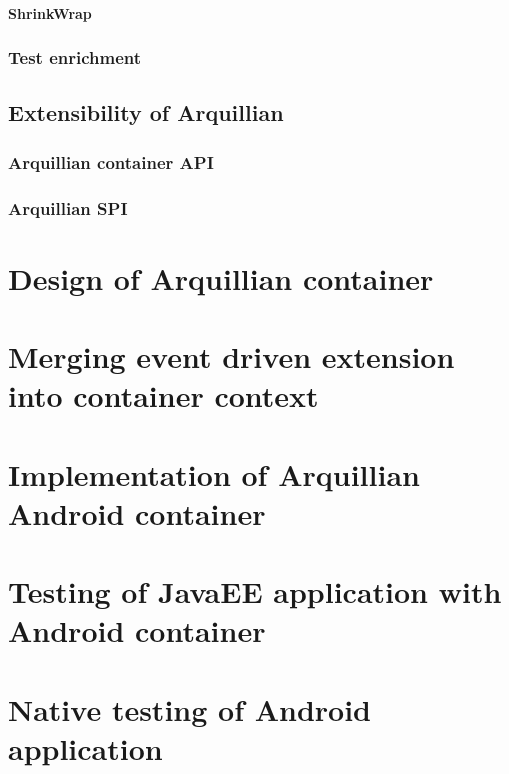 \documentclass[12pt,final,oneside]{fithesis}
\begin{document}
			\subsubsection{ShrinkWrap}
		\subsection{Test enrichment}
	\section{Extensibility of Arquillian}
		\subsection{Arquillian container API}
		\subsection{Arquillian SPI}
	
\chapter{Design of Arquillian container}
	\chapter{Merging event driven extension into container context}
	
\chapter{Implementation of Arquillian Android container}

\chapter{Testing of JavaEE application with Android container}

\chapter{Native testing of Android application}



\printindex

%
%

\appendix
\end{document}
